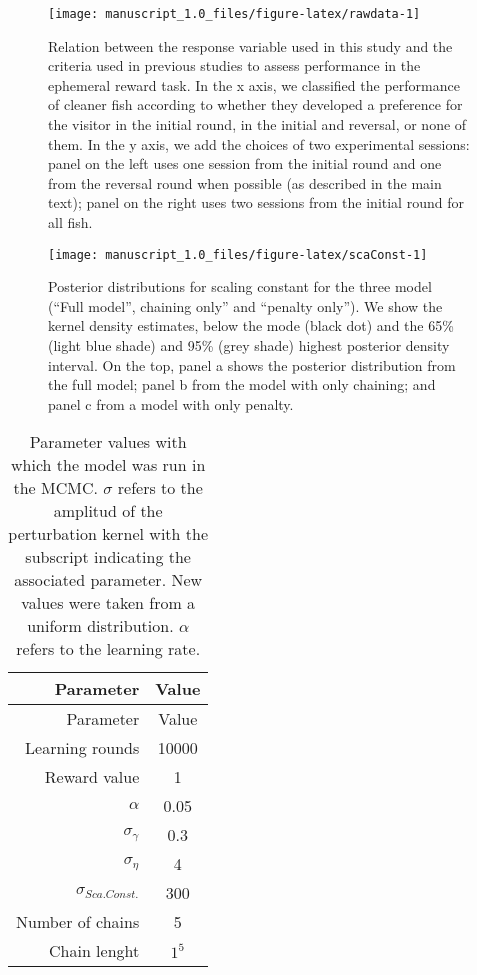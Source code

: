 \documentclass[]{rsos}%
\begin{document}
\begin{figure}

{\centering \texttt{[image: manuscript\_1.0\_files/figure-latex/rawdata-1]} 

}

\caption{Relation between the response variable used in this study and the
criteria used in previous studies to assess performance in the ephemeral reward
task. In the x axis, we classified the performance of cleaner fish according to
whether they developed a preference for the visitor in the initial round,
in the initial and reversal, or none of them. In the y axis, we add the choices
of two experimental sessions: panel on the left uses one session from the initial
round and one from the reversal round when possible
(as described in the main text); panel on the right uses two sessions from the
initial round for all fish.}\label{fig:rawdata}
\end{figure}








\begin{figure}[H]

{\centering \texttt{[image: manuscript\_1.0\_files/figure-latex/scaConst-1]} 

}

\caption{Posterior distributions for scaling constant for the three model
(``Full model'', chaining only'' and ``penalty only''). We show the kernel
density estimates, below the mode (black dot) and the 65\% (light blue shade)
and 95\% (grey shade) highest posterior density interval. On the top,
panel a shows the posterior distribution from the full model; panel b from
the model with only chaining; and panel c from a model with only penalty.}\label{fig:scaConst}
\end{figure}

\begin{longtable}[]{@{}rc@{}}
\caption{\label{tab:param} Parameter values with which the model was run
in the MCMC. \(\sigma\) refers to the amplitud of the perturbation kernel with the subscript indicating the associated parameter. New values were taken from a uniform distribution. \(\alpha\) refers to the learning rate.}\tabularnewline
\toprule
Parameter & Value \\
\midrule
\endfirsthead
\toprule
Parameter & Value \\
\midrule
\endhead
Learning rounds & 10000 \\
Reward value & 1 \\
\(\alpha\) & 0.05 \\
\(\sigma_{\gamma}\) & 0.3 \\
\(\sigma_{\eta}\) & 4 \\
\(\sigma_{Sca.Const.}\) & 300 \\
Number of chains & 5 \\
Chain lenght & \(1^5\) \\
\bottomrule
\end{longtable}
\end{document}

